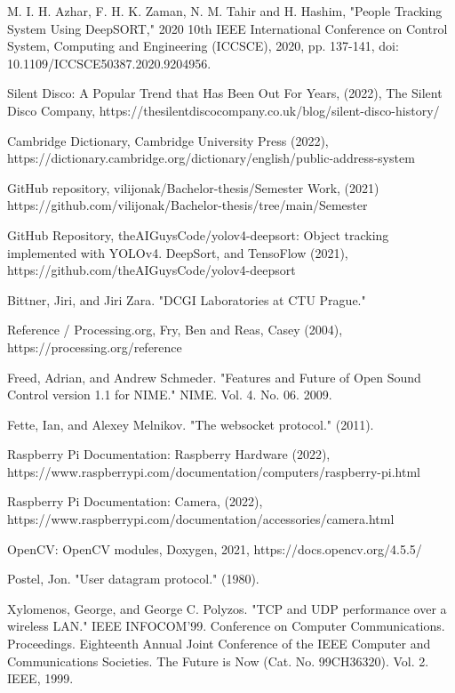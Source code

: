 \documentclass{ctuthesis}
\begin{document}
\begin{thebibliography}{1}

  M. I. H. Azhar, F. H. K. Zaman, N. M. Tahir and H. Hashim, "People Tracking System Using DeepSORT," 2020 10th IEEE International Conference on Control System, Computing and Engineering (ICCSCE), 2020, pp. 137-141, doi: 10.1109/ICCSCE50387.2020.9204956.

  Silent Disco: A Popular Trend that Has Been Out For Years, (2022), The Silent Disco Company, https://thesilentdiscocompany.co.uk/blog/silent-disco-history/
 
  Cambridge Dictionary, Cambridge University Press (2022), https://dictionary.cambridge.org/dictionary/english/public-address-system
 
  GitHub repository, vilijonak/Bachelor-thesis/Semester Work, (2021) https://github.com/vilijonak/Bachelor-thesis/tree/main/Semester%
 
  GitHub Repository, theAIGuysCode/yolov4-deepsort: Object tracking implemented with YOLOv4. DeepSort, and TensoFlow (2021), https://github.com/theAIGuysCode/yolov4-deepsort

 Bittner, Jiri, and Jiri Zara. "DCGI Laboratories at CTU Prague."

 Reference / Processing.org, Fry, Ben and Reas, Casey (2004), https://processing.org/reference 

 Freed, Adrian, and Andrew Schmeder. "Features and Future of Open Sound Control version 1.1 for NIME." NIME. Vol. 4. No. 06. 2009.

 Fette, Ian, and Alexey Melnikov. "The websocket protocol." (2011).

  Raspberry Pi Documentation: Raspberry Hardware (2022), https://www.raspberrypi.com/documentation/computers/raspberry-pi.html

  Raspberry Pi Documentation: Camera, (2022), https://www.raspberrypi.com/documentation/accessories/camera.html
 
  OpenCV: OpenCV modules, Doxygen, 2021, https://docs.opencv.org/4.5.5/
 
  Postel, Jon. "User datagram protocol." (1980).
 
  Xylomenos, George, and George C. Polyzos. "TCP and UDP performance over a wireless LAN." IEEE INFOCOM'99. Conference on Computer Communications. Proceedings. Eighteenth Annual Joint Conference of the IEEE Computer and Communications Societies. The Future is Now (Cat. No. 99CH36320). Vol. 2. IEEE, 1999.



\end{thebibliography}
\end{document}
